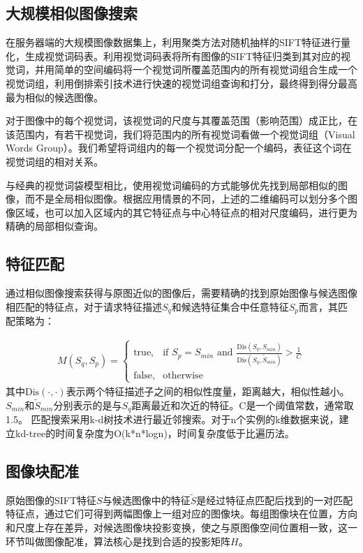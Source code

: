 \documentclass[UTF8]{csoarticle}
\begin{document}
\subsection{大规模相似图像搜索}

在服务器端的大规模图像数据集上，利用聚类方法对随机抽样的SIFT特征进行量化，生成视觉词码表。利用视觉词码表将所有图像的SIFT特征归类到其对应的视觉词，并用简单的空间编码将一个视觉词所覆盖范围内的所有视觉词组合生成一个视觉词组，利用倒排索引技术进行快速的视觉词组查询和打分，最终得到得分最高最为相似的候选图像。

对于图像中的每个视觉词，该视觉词的尺度与其覆盖范围（影响范围）成正比，在该范围内，有若干视觉词，我们将范围内的所有视觉词看做一个视觉词组（Visual Words Group）。我们希望将词组内的每一个视觉词分配一个编码，表征这个词在视觉词组的相对关系。

与经典的视觉词袋模型相比，使用视觉词编码的方式能够优先找到局部相似的图像，而不是全局相似图像。根据应用情景的不同，上述的二维编码可以划分多个图像区域，也可以加入区域内的其它特征点与中心特征点的相对尺度编码，进行更为精确的局部相似查询。

\subsection{特征匹配}

通过相似图像搜索获得与原图近似的图像后，需要精确的找到原始图像与候选图像相匹配的特征点，对于请求特征描述\(S_q\)和候选特征集合中任意特征\(S_p\)而言，其匹配策略为：

\begin{align}
  M(S_q,S_p) = 
\begin{cases} 
\text{true}, & \mbox{if } S_p = S_{min}\text{ and }\frac{\text{Dis}(S_q,S_{min})}{\text{Dis}(S_q,\tilde{S}_{min})} > \frac{1}{C} \\
\text{false}, & \mbox{otherwise}
\end{cases}
\end{align}
其中\(\text{Dis}(\cdot,\cdot)\)表示两个特征描述子之间的相似性度量，距离越大，相似性越小。\(S_{min}\)和\(\tilde{S}_{min}\)分别表示的是与\(S_q\)距离最近和次近的特征。C是一个阈值常数，通常取1.5。%
匹配搜索采用k-d树技术进行最近邻搜索。对于n个实例的k维数据来说，建立kd-tree的时间复杂度为O(k*n*logn)，时间复杂度低于比遍历法。

\subsection{图像块配准}
原始图像的SIFT特征\(S\)与候选图像中的特征\(\tilde{S}\)是经过特征点匹配后找到的一对匹配特征点，通过它们可得到两幅图像上一组对应的图像块。每组图像块在位置，方向和尺度上存在差异，对候选图像块投影变换，使之与原图像空间位置相一致，这一环节叫做图像配准，算法核心是找到合适的投影矩阵\(H\)。
\end{document}

